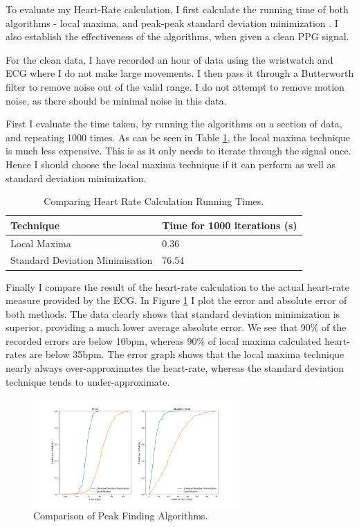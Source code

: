 \documentclass[12pt,a4paper,twoside,openright]{report}
\begin{document}
To evaluate my Heart-Rate calculation, I first calculate the running time of
both algorithms - local maxima, and peak-peak standard deviation minimization
. I also establish the effectiveness of the algorithms, when given a clean
PPG signal.

For the clean data, I have recorded an hour of data using the wristwatch and ECG
where I do not make large movements. I then pass it through a Butterworth filter to remove
noise out of the valid range. I do not attempt to remove motion noise, as
there should be minimal noise in this data.

First I evaluate the time taken, by running the algorithms on a section of
data, and repeating 1000 times. As can be seen in Table \ref{table:hr-times},
the local maxima technique is much less expensive. This is as it only needs to
iterate through the signal once. Hence I should choose the local maxima
technique if it can perform as well as standard deviation minimization.

\begin{table}[]
\centering
\caption{Comparing Heart Rate Calculation Running Times.}
\label{table:hr-times}
\begin{tabular}{|l|l|}
\hline
Technique                       & Time for 1000 iterations (s) \\ \hline
Local Maxima                    & 0.36                         \\
Standard Deviation Minimisation & 76.54                        \\
\hline
\end{tabular}
\end{table}

Finally I compare the result of the heart-rate calculation to the actual
heart-rate measure provided by the ECG.
In Figure \ref{fig:hrc-error} I plot the error and absolute error of both
methods. The data clearly shows that standard deviation minimization is
superior, providing a much lower average absolute error. We see that 90\% of
the recorded errors are below 10bpm, whereas 90\% of local maxima calculated
heart-rates are below 35bpm. The error graph shows that the local maxima
technique nearly always over-approximates the heart-rate, whereas the standard
deviation technique tends to under-approximate.

\begin{figure}[tbh]
	\centerline{\includegraphics[width=0.7\textwidth]{figs/peakfind.png}}
	\caption{Comparison of Peak Finding Algorithms.}
	\label{fig:hrc-error}
\end{figure}
\end{document}
